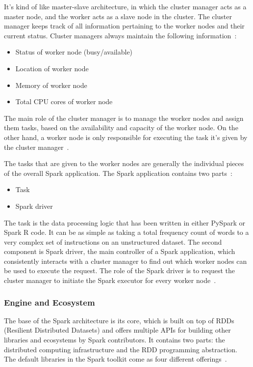 \documentclass[]{final_report}
\begin{document}
It’s kind of like master-slave architecture, in which the cluster manager acts as a master node, and the worker acts as a slave node in the cluster. The cluster manager keeps track of all information pertaining to the worker nodes and their current status. Cluster managers always maintain the following information~\cite{singh_manage_2022}:

\begin{itemize}
    \item Status of worker node (busy/available)
    \item Location of worker node
    \item Memory of worker node
    \item Total CPU cores of worker node
\end{itemize}

The main role of the cluster manager is to manage the worker nodes and assign them tasks, based on the availability and capacity of the worker node. On the other hand, a worker node is only responsible for executing the task it’s given by the cluster manager~\cite{singh_manage_2022}.

The tasks that are given to the worker nodes are generally the individual pieces of the overall Spark application. The Spark application contains two parts~\cite{singh_manage_2022}:

\begin{itemize}
    \item Task
    \item Spark driver
\end{itemize}

The task is the data processing logic that has been written in either PySpark or Spark R code. It can be as simple as taking a total frequency count of words to a very complex set of instructions on an unstructured dataset. The second component is Spark driver, the main controller of a Spark application, which consistently interacts with a cluster manager to find out which worker nodes can be used to execute the request. The role of the Spark driver is to request the cluster manager to initiate the Spark executor for every worker node~\cite{singh_manage_2022}.

\clearpage

\subsubsection{Engine and Ecosystem}

The base of the Spark architecture is its core, which is built on top of RDDs (Resilient Distributed Datasets) and offers multiple APIs for building other libraries and ecosystems by Spark contributors. It contains two parts: the distributed computing infrastructure and the RDD programming abstraction. The default libraries in the Spark toolkit come as four different offerings~\cite{singh_manage_2022}.
\end{document}
